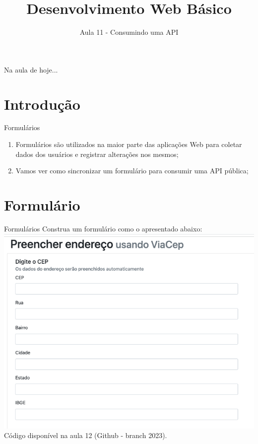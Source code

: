 \documentclass{beamer}
\title{Desenvolvimento Web Básico}
\subtitle{Aula 11 - Consumindo uma API}
\begin{document}
\frame{
 \titlepage
}

\begin{frame}{Na aula de hoje...} 
\tableofcontents 
\end{frame}
\section{Introdução}
\begin{frame}{Formulários}
  \begin{enumerate}
      \item Formulários são utilizados na maior parte das aplicações Web para coletar dados dos usuários e registrar alterações nos mesmos;
      \item Vamos ver como sincronizar um formulário para consumir uma API pública;
  \end{enumerate}
\end{frame}
\section{Formulário}
\begin{frame}{Formulários}
Construa um formulário como o apresentado abaixo:
\includegraphics[height=0.6\paperheight]{fig/aula11/aula11_1.png}
Código disponível na aula 12 (Github - branch 2023).
\end{frame}
\end{document}

